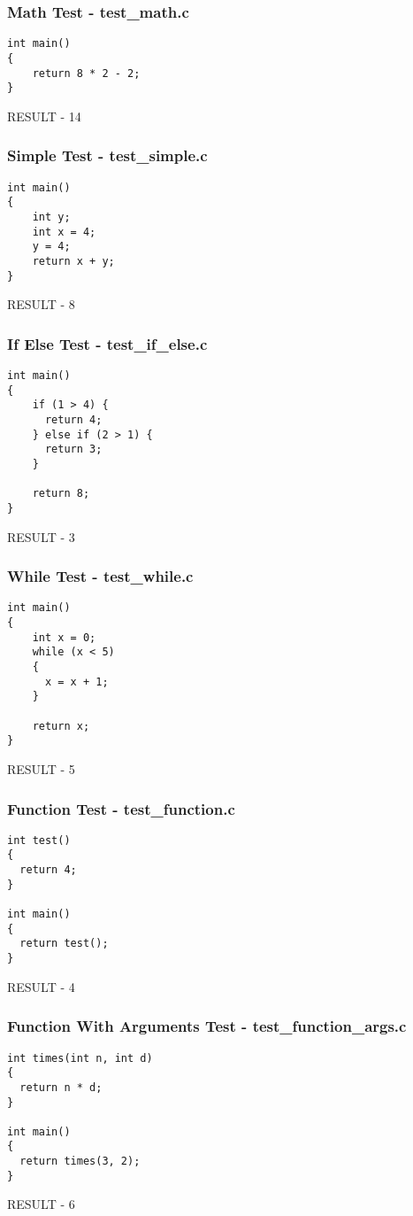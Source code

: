 \documentclass{article}
\begin{document}
\subsubsection{Math Test - test\_math.c}
\begin{lstlisting}
int main()
{
    return 8 * 2 - 2;
}
\end{lstlisting}
RESULT - 14

\subsubsection{Simple Test - test\_simple.c}
\begin{lstlisting}
int main()
{
    int y;
    int x = 4;
    y = 4;
    return x + y;
}
\end{lstlisting}
RESULT - 8

\subsubsection{If Else Test - test\_if\_else.c}
\begin{lstlisting}
int main()
{
    if (1 > 4) {
      return 4;
    } else if (2 > 1) {
      return 3;
    }

    return 8;
}
\end{lstlisting}
RESULT - 3

\subsubsection{While Test - test\_while.c}
\begin{lstlisting}
int main()
{
    int x = 0;
    while (x < 5)
    {
      x = x + 1;
    }

    return x;
}
\end{lstlisting}
RESULT - 5

\subsubsection{Function Test - test\_function.c}
\begin{lstlisting}
int test()
{
  return 4;
}

int main()
{
  return test();
}
\end{lstlisting}
RESULT - 4

\subsubsection{Function With Arguments Test - test\_function\_args.c}
\begin{lstlisting}
int times(int n, int d)
{
  return n * d;
}

int main()
{
  return times(3, 2);
}
\end{lstlisting}
RESULT - 6
\end{document}
